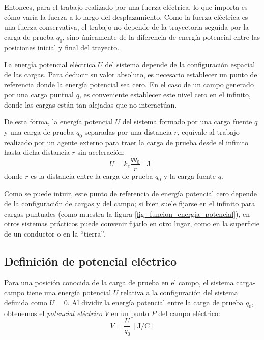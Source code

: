 Entonces, para el trabajo realizado por una fuerza eléctrica, lo que importa es cómo varía la fuerza a lo largo del desplazamiento. Como la fuerza eléctrica es una fuerza conservativa, el trabajo no depende de la trayectoria seguida por la carga de prueba \(q_0\), sino únicamente de la diferencia de energía potencial entre las posiciones inicial y final del trayecto.

La energía potencial eléctrica \(U\) del sistema depende de la configuración espacial de las cargas. Para deducir su valor absoluto, es necesario establecer un punto de referencia donde la energía potencial sea cero. En el caso de un campo generado por una carga puntual \(q\), es conveniente establecer este nivel cero en el infinito, donde las cargas están tan alejadas que no interactúan. 

De esta forma, la energía potencial \(U\) del sistema formado por una carga fuente \(q\) y una carga de prueba \(q_0\) separadas por una distancia \(r\), equivale al trabajo realizado por un agente externo para traer la carga de prueba desde el infinito hasta dicha distancia \(r\) sin aceleración:
\[
  U = k_e\frac{q q_0}{r}~ [\unit{\joule}]
\]
donde \(r\) es la distancia entre la carga de prueba \(q_0\) y la carga fuente \(q\).

\begin{marginfigure}[-2cm]
  \centering
  \caption{Gráfica de la energía potencial \(U\) contra la separación \(r\).}
  \label{fig_funcion_energia_potencial}
  
\end{marginfigure}
Como se puede intuir, este punto de referencia de energía potencial cero depende de la configuración de cargas y del campo; si bien suele fijarse en el infinito para cargas puntuales (como muestra la figura \ref{fig_funcion_energia_potencial}), en otros sistemas prácticos puede convenir fijarlo en otro lugar, como en la superficie de un conductor o en la ``tierra''.

\subsection{Definición de potencial eléctrico}

\begin{definition}\label{def_potencial}
Para una posición conocida de la carga de prueba en el campo, el sistema carga-campo tiene una energía potencial \(U\) relativa a la configuración del sistema definida como \(U=0\). Al dividir la energía potencial entre la carga de prueba \(q_0\), obtenemos el \emph{potencial eléctrico} \(V\) en un punto \(P\) del campo eléctrico:
\begin{equation}
  V = \frac{U}{q_0} ~ [\unit{\joule\per\coulomb}]
  \label{eq:potential}
\end{equation}
\end{definition}

